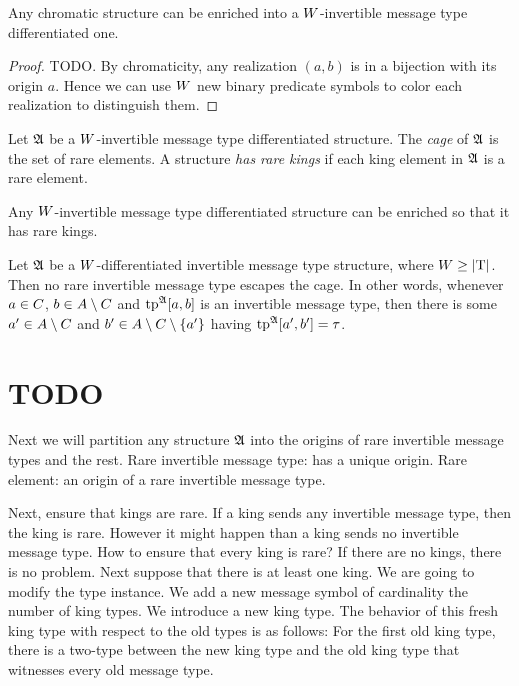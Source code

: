\begin{remark}
Any chromatic structure can be enriched into a $W$-invertible message type
differentiated one.
\end{remark}
\begin{proof}
TODO.
By chromaticity, any realization $(a,b)$ is in a bijection with its origin $a$.
Hence we can use $W$ new binary predicate symbols to color each realization to
distinguish them.
\end{proof}

\begin{definition}
Let $\mathfrak{A}$ be a $W$-invertible message type differentiated structure.
The \emph{cage} of $\mathfrak{A}$ is the set of rare elements.
A structure \emph{has rare kings} if each king element in $\mathfrak{A}$ is a rare
element.
\end{definition}

\begin{remark}
Any $W$-invertible message type differentiated structure can be enriched so
that it has rare kings.
\end{remark}

\begin{remark}
Let $\mathfrak{A}$ be a $W$-differentiated invertible message type structure, where
$W\geq\left|\mathrm{T}\right|$.
Then no rare invertible message type escapes the cage.
In other words, whenever $a\in C$, $b\in A\setminus C$ and $\operatorname{tp}^{\mathfrak{A}}[a,b]$
is an invertible message type, then there is some ${a'}\in A\setminus C$ and
${b'}\in A\setminus C\setminus\left\{{a'}\right\}$ having $\operatorname{tp}^{\mathfrak{A}}[{a'},{b'}] = \tau$.
\end{remark}

\section{TODO}
Next we will partition any structure $\mathfrak{A}$ into the origins of rare invertible
message types and the rest.
Rare invertible message type: has a unique origin.
Rare element: an origin of a rare invertible message type.

Next, ensure that kings are rare.
If a king sends any invertible message type, then the king is rare.
However it might happen than a king sends no invertible message type.
How to ensure that every king is rare?
If there are no kings, there is no problem.
Next suppose that there is at least one king.
We are going to modify the type instance.
We add a new message symbol of cardinality the number of king types.
We introduce a new king type.
The behavior of this fresh king type with respect to the old types is as
follows:
For the first old king type, there is a two-type between the new king type and
the old king type that witnesses every old message type.

